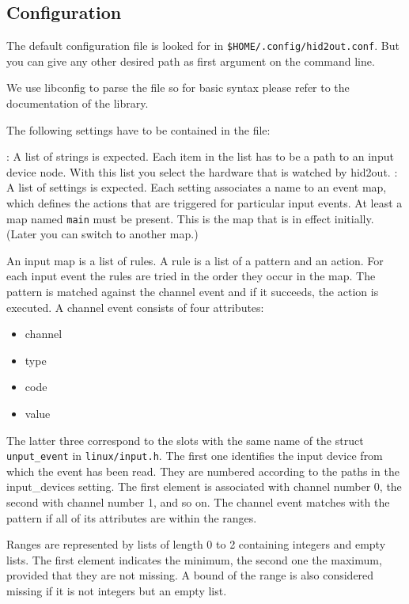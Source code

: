 \subsection{Configuration}
The default configuration file is looked for in 
\verb|$HOME/.config/hid2out.conf|. But you can give any other 
desired path as first argument on the command line.

We use libconfig to parse the file so for basic syntax please 
refer to the documentation of the library.

The following settings have to be contained in the  file:
\begin{pdescription}
:
  A list of strings is expected. Each item in the list 
  has to be a path to an input device node.
  With this list you select the hardware that is watched by
  hid2out.
:
  A list of settings is expected.
  Each setting associates a name to an event map, which
  defines the actions that are triggered for particular input events.
  At least a map named \texttt{main} must be present.
  This is the map that is in effect initially.
  (Later you can switch to another map.)

  An input map is a list of rules.
  A rule is a list of a pattern and an action.
  For each input event the rules are tried in the order they occur in the map.
  The pattern is matched against the channel event and if it succeeds, the 
  action is executed.
  A channel event consists of four attributes:
  \begin{itemize}
  \item channel
  \item type
  \item code
  \item value
  \end{itemize}
  The latter three correspond to the slots with the same name of 
  the struct \texttt{unput\_event} in \texttt{linux/input.h}.
  The first one identifies the input device from which the event has been
  read. They are numbered according to the paths in the input\_devices setting.
  The first element is associated with channel number 0, the second with channel
  number 1, and so on.
  The channel event matches with the pattern if all of its attributes
  are within the ranges.
  
  Ranges are represented by lists of length 0 to 2
  containing integers and empty lists.
  The first element indicates the minimum,
  the second one the maximum, provided that they are not missing.
  A bound of the range is also considered missing if it is not integers but 
  an empty list.


\end{pdescription}
